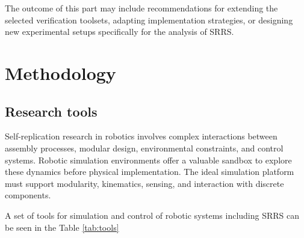 The outcome of this part may include recommendations for extending the 
selected verification toolsets, adapting implementation strategies, or designing 
new experimental setups specifically for the analysis of SRRS.



\chapter{Methodology}




\section{Research tools}


Self-replication research in robotics involves complex interactions between 
assembly processes, modular design, environmental constraints, 
and control systems. 
Robotic simulation environments offer a valuable sandbox to 
explore these dynamics before physical implementation. 
The ideal simulation platform must support modularity, kinematics, 
sensing, and interaction with discrete components.

A set of tools for simulation and control of robotic systems including SRRS can be 
seen in the Table \ref{tab:tools}

